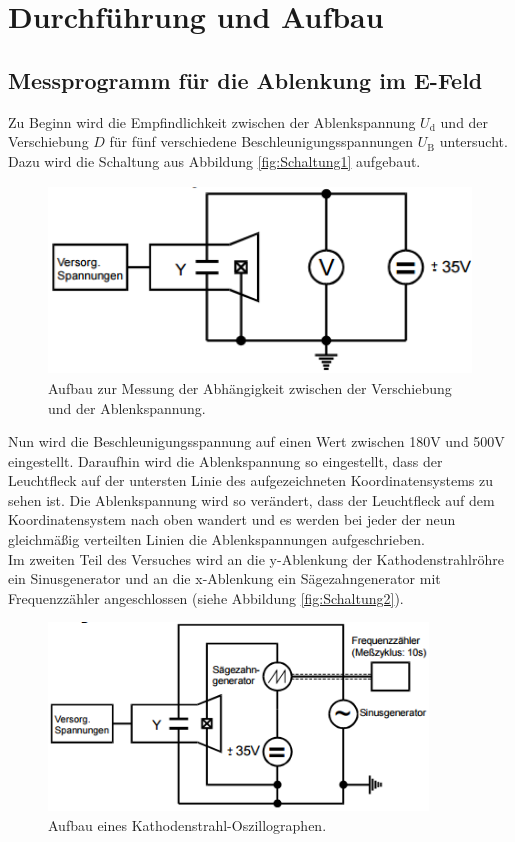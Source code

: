 \section{Durchführung und Aufbau}
\label{sec:Durchführung}
\subsection{Messprogramm für die Ablenkung im E-Feld}
Zu Beginn wird die Empfindlichkeit zwischen der Ablenkspannung $U_\text{d}$ und der Verschiebung $D$ für fünf verschiedene Beschleunigungsspannungen $U_\text{B}$ untersucht. Dazu wird die Schaltung aus Abbildung \eqref{fig:Schaltung1} aufgebaut.

\begin{figure}[H]
  \centering
  \includegraphics[height=5cm]{picture/Schaltung1}
  \caption{Aufbau zur Messung der Abhängigkeit zwischen der Verschiebung und der Ablenkspannung. \cite[5]{V501}}
  \label{fig:Schaltung1}
\end{figure}

Nun wird die Beschleunigungsspannung auf einen Wert zwischen 180V und 500V eingestellt. Daraufhin wird die Ablenkspannung so eingestellt, dass der Leuchtfleck auf der untersten Linie des aufgezeichneten Koordinatensystems zu sehen ist. Die Ablenkspannung wird so verändert, dass der Leuchtfleck auf dem Koordinatensystem nach oben wandert und es werden bei jeder der neun gleichmäßig verteilten Linien die Ablenkspannungen aufgeschrieben. \\
Im zweiten Teil des Versuches wird an die y-Ablenkung der Kathodenstrahlröhre ein Sinusgenerator und an die x-Ablenkung ein Sägezahngenerator mit Frequenzzähler angeschlossen (siehe Abbildung \eqref{fig:Schaltung2}).

\begin{figure}[H]
  \centering
  \includegraphics[height=5cm]{picture/Schaltung2}
  \caption{Aufbau eines Kathodenstrahl-Oszillographen. \cite[5]{V501}}
  \label{fig:Schaltung2}
\end{figure}

